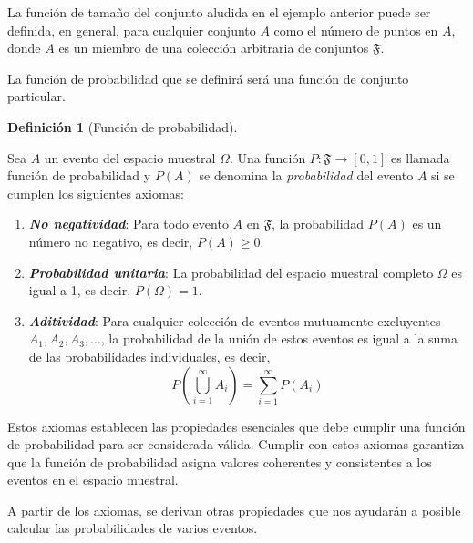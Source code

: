 \documentclass[
  letterpaper,
  DIV=11,
  numbers=noendperiod]{scrreport}
\theoremstyle{plain}
\theoremstyle{definition}
\newtheorem{definition}{Definición}[chapter]
\theoremstyle{definition}
\theoremstyle{plain}
\theoremstyle{remark}
\begin{document}
La función de tamaño del conjunto aludida en el ejemplo anterior puede
ser definida, en general, para cualquier conjunto \(A\) como el número
de puntos en \(A\), donde \(A\) es un miembro de una colección
arbitraria de conjuntos \(\mathfrak{F}\).

La función de probabilidad que se definirá será una función de conjunto
particular.

\begin{definition}[Función de
probabilidad]\protect\hypertarget{def-fprob}{}\label{def-fprob}

Sea \(A\) un evento del espacio muestral \(\Omega\). Una función
\(P: \mathfrak{F} \to [0,1]\) es llamada función de probabilidad y
\(P(A)\) se denomina la \emph{probabilidad} del evento \(A\) si se
cumplen los siguientes axiomas:

\begin{enumerate}
\def\labelenumi{\roman{enumi}.}
\item
  \textbf{\emph{No negatividad}}: Para todo evento \(A\) en
  \(\mathfrak{F}\), la probabilidad \(P(A)\) es un número no negativo,
  es decir, \(P(A) \geq 0\).
\item
  \textbf{\emph{Probabilidad unitaria}}: La probabilidad del espacio
  muestral completo \(\Omega\) es igual a 1, es decir,
  \(P(\Omega) = 1\).
\item
  \textbf{\emph{Aditividad}}: Para cualquier colección de eventos
  mutuamente excluyentes \(A_1, A_2, A_3, \ldots\), la probabilidad de
  la unión de estos eventos es igual a la suma de las probabilidades
  individuales, es decir,
  \[P\left(\bigcup_{i=1}^\infty A_i\right) = \sum_{i=1}^\infty P(A_i)\]
\end{enumerate}

\end{definition}

Estos axiomas establecen las propiedades esenciales que debe cumplir una
función de probabilidad para ser considerada válida. Cumplir con estos
axiomas garantiza que la función de probabilidad asigna valores
coherentes y consistentes a los eventos en el espacio muestral.

A partir de los axiomas, se derivan otras propiedades que nos ayudarán a
posible calcular las probabilidades de varios eventos.
\end{document}
